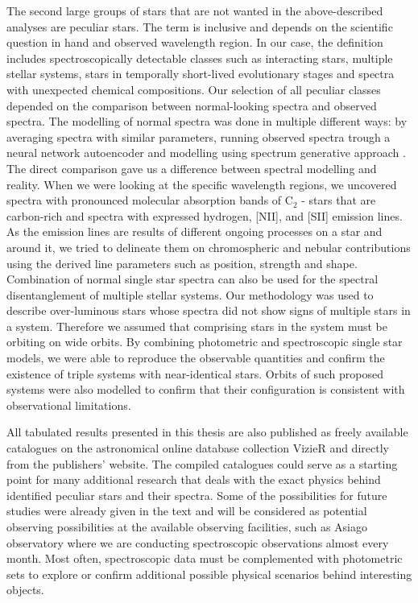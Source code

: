 The second large groups of stars that are not wanted in the above-described analyses are peculiar stars. The term is inclusive and depends on the scientific question in hand and observed wavelength region. In our case, the definition includes spectroscopically detectable classes such as interacting stars, multiple stellar systems, stars in temporally short-lived evolutionary stages and spectra with unexpected chemical compositions. Our selection of all peculiar classes depended on the comparison between normal-looking spectra and observed spectra. The modelling of normal spectra was done in multiple different ways: by averaging spectra with similar parameters, running observed spectra trough a neural network autoencoder and modelling using spectrum generative approach \TC. The direct comparison gave us a difference between spectral modelling and reality. When we were looking at the specific wavelength regions, we uncovered spectra with pronounced molecular absorption bands of C$_2$ - stars that are carbon-rich and spectra with expressed hydrogen, [NII], and [SII] emission lines. As the emission lines are results of different ongoing processes on a star and around it, we tried to delineate them on chromospheric and nebular contributions using the derived line parameters such as position, strength and shape. Combination of normal single star spectra can also be used for the spectral disentanglement of multiple stellar systems. Our methodology was used to describe over-luminous stars whose spectra did not show signs of multiple stars in a system. Therefore we assumed that comprising stars in the system must be orbiting on wide orbits. By combining photometric and spectroscopic single star models, we were able to reproduce the observable quantities and confirm the existence of triple systems with near-identical stars. Orbits of such proposed systems were also modelled to confirm that their configuration is consistent with observational limitations.

All tabulated results presented in this thesis are also published as freely available catalogues on the astronomical online database collection VizieR and directly from the publishers' website. The compiled catalogues could serve as a starting point for many additional research that deals with the exact physics behind identified peculiar stars and their spectra. Some of the possibilities for future studies were already given in the text and will be considered as potential observing possibilities at the available observing facilities, such as Asiago observatory where we are conducting spectroscopic observations almost every month. Most often, spectroscopic data must be complemented with photometric sets to explore or confirm additional possible physical scenarios behind interesting objects.

